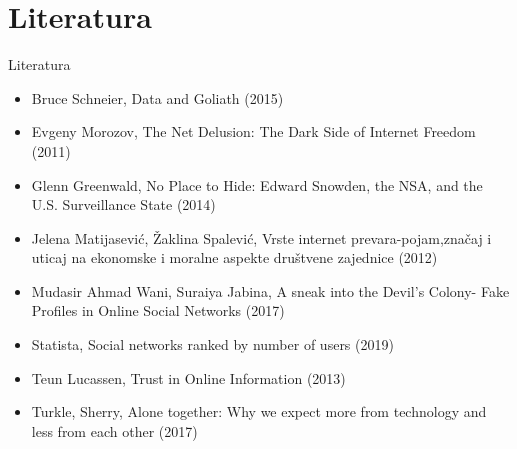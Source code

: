 \documentclass{beamer}
\begin{document}
	
	\section{Literatura}
		\begin{frame}{Literatura}
			\begin{itemize}
				\scriptsize
				\item Bruce Schneier, Data and Goliath (2015)
				\item Evgeny Morozov, The Net Delusion: The Dark Side of Internet Freedom (2011)
				\item Glenn Greenwald, No Place to Hide: Edward Snowden, the NSA, and the U.S. Surveillance State (2014)
				\item Jelena Matijasević, Žaklina Spalević, Vrste internet prevara-pojam,značaj i uticaj na ekonomske i moralne aspekte društvene zajednice (2012)
				\item Mudasir Ahmad Wani, Suraiya Jabina, A sneak into the Devil’s Colony- Fake Profiles in Online Social Networks (2017)
				\item Statista, Social networks ranked by number of users (2019)
				\item Teun Lucassen, Trust in Online Information (2013)
				\item Turkle, Sherry, Alone together: Why we expect more from technology and less from each other (2017)
				
			\end{itemize}
			
		\end{frame}
\end{document}
